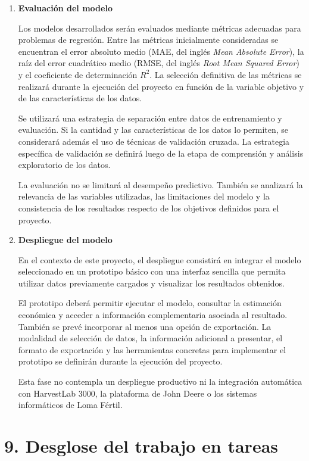 \documentclass[
11pt, %
]{charter}
\begin{document}
\begin{enumerate}
  \item \textbf{Evaluación del modelo}

  Los modelos desarrollados serán evaluados mediante métricas adecuadas para problemas de regresión. Entre las métricas inicialmente consideradas se encuentran el error absoluto medio (MAE, del inglés \textit{Mean Absolute Error}), la raíz del error cuadrático medio (RMSE, del inglés \textit{Root Mean Squared Error}) y el coeficiente de determinación \(R^2\). La selección definitiva de las métricas se realizará durante la ejecución del proyecto en función de la variable objetivo y de las características de los datos.

  Se utilizará una estrategia de separación entre datos de entrenamiento y evaluación. Si la cantidad y las características de los datos lo permiten, se considerará además el uso de técnicas de validación cruzada. La estrategia específica de validación se definirá luego de la etapa de comprensión y análisis exploratorio de los datos.

  La evaluación no se limitará al desempeño predictivo. También se analizará la relevancia de las variables utilizadas, las limitaciones del modelo y la consistencia de los resultados respecto de los objetivos definidos para el proyecto.


  \item \textbf{Despliegue del modelo}

  En el contexto de este proyecto, el despliegue consistirá en integrar el modelo seleccionado en un prototipo básico con una interfaz sencilla que permita utilizar datos previamente cargados y visualizar los resultados obtenidos.

  El prototipo deberá permitir ejecutar el modelo, consultar la estimación económica y acceder a información complementaria asociada al resultado. También se prevé incorporar al menos una opción de exportación. La modalidad de selección de datos, la información adicional a presentar, el formato de exportación y las herramientas concretas para implementar el prototipo se definirán durante la ejecución del proyecto.

  Esta fase no contempla un despliegue productivo ni la integración automática con HarvestLab 3000, la plataforma de John Deere o los sistemas informáticos de Loma Fértil.

\end{enumerate}





\section{9. Desglose del trabajo en tareas}
\label{sec:wbs}
\end{document}
